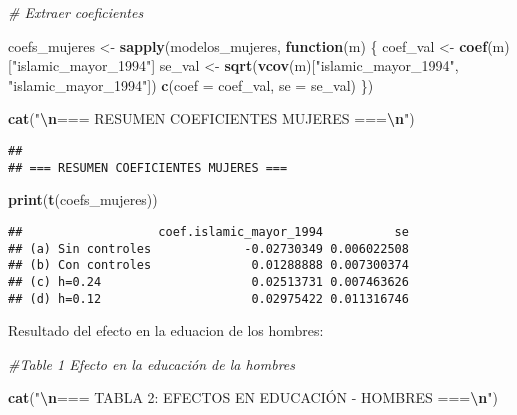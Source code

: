 \documentclass[
]{article}
\newenvironment{Shaded}{\begin{snugshade}}{\end{snugshade}}
\newcommand{\AttributeTok}[1]{\textcolor[rgb]{0.13,0.29,0.53}{#1}}
\newcommand{\CommentTok}[1]{\textcolor[rgb]{0.56,0.35,0.01}{\textit{#1}}}
\newcommand{\ControlFlowTok}[1]{\textcolor[rgb]{0.13,0.29,0.53}{\textbf{#1}}}
\newcommand{\FunctionTok}[1]{\textcolor[rgb]{0.13,0.29,0.53}{\textbf{#1}}}
\newcommand{\NormalTok}[1]{#1}
\newcommand{\OtherTok}[1]{\textcolor[rgb]{0.56,0.35,0.01}{#1}}
\newcommand{\SpecialCharTok}[1]{\textcolor[rgb]{0.81,0.36,0.00}{\textbf{#1}}}
\newcommand{\StringTok}[1]{\textcolor[rgb]{0.31,0.60,0.02}{#1}}
\begin{document}
\begin{Shaded}
\begin{Highlighting}[]
\CommentTok{\# Extraer coeficientes}

\NormalTok{coefs\_mujeres }\OtherTok{\textless{}{-}} \FunctionTok{sapply}\NormalTok{(modelos\_mujeres, }\ControlFlowTok{function}\NormalTok{(m) \{}
\NormalTok{  coef\_val }\OtherTok{\textless{}{-}} \FunctionTok{coef}\NormalTok{(m)[}\StringTok{"islamic\_mayor\_1994"}\NormalTok{]}
\NormalTok{  se\_val }\OtherTok{\textless{}{-}} \FunctionTok{sqrt}\NormalTok{(}\FunctionTok{vcov}\NormalTok{(m)[}\StringTok{"islamic\_mayor\_1994"}\NormalTok{, }\StringTok{"islamic\_mayor\_1994"}\NormalTok{])}
  \FunctionTok{c}\NormalTok{(}\AttributeTok{coef =}\NormalTok{ coef\_val, }\AttributeTok{se =}\NormalTok{ se\_val)}
\NormalTok{\})}

\FunctionTok{cat}\NormalTok{(}\StringTok{"}\SpecialCharTok{\textbackslash{}n}\StringTok{=== RESUMEN COEFICIENTES MUJERES ===}\SpecialCharTok{\textbackslash{}n}\StringTok{"}\NormalTok{)}
\end{Highlighting}
\end{Shaded}

\begin{verbatim}
## 
## === RESUMEN COEFICIENTES MUJERES ===
\end{verbatim}

\begin{Shaded}
\begin{Highlighting}[]
\FunctionTok{print}\NormalTok{(}\FunctionTok{t}\NormalTok{(coefs\_mujeres))}
\end{Highlighting}
\end{Shaded}

\begin{verbatim}
##                   coef.islamic_mayor_1994          se
## (a) Sin controles             -0.02730349 0.006022508
## (b) Con controles              0.01288888 0.007300374
## (c) h=0.24                     0.02513731 0.007463626
## (d) h=0.12                     0.02975422 0.011316746
\end{verbatim}

Resultado del efecto en la eduacion de los hombres:

\begin{Shaded}
\begin{Highlighting}[]
\CommentTok{\#Table 1 Efecto en la educación de la hombres}

\FunctionTok{cat}\NormalTok{(}\StringTok{"}\SpecialCharTok{\textbackslash{}n}\StringTok{=== TABLA 2: EFECTOS EN EDUCACIÓN {-} HOMBRES ===}\SpecialCharTok{\textbackslash{}n}\StringTok{"}\NormalTok{)}
\end{Highlighting}
\end{Shaded}
\end{document}
